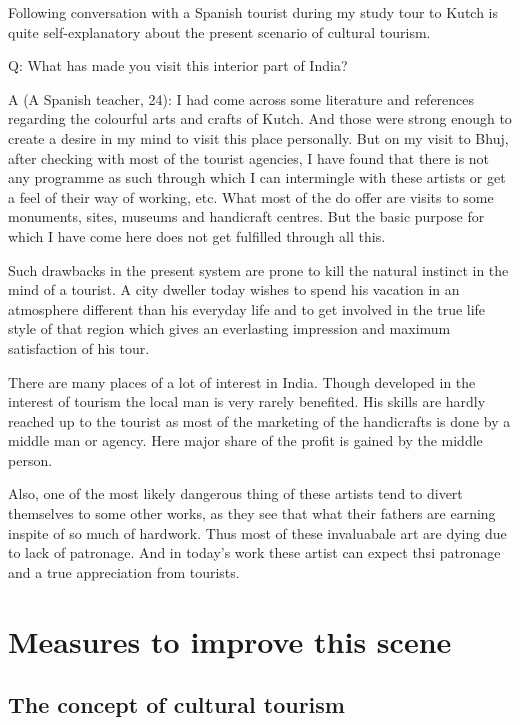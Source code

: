 Following conversation with a Spanish tourist during my study tour to Kutch is quite self-explanatory about the present scenario of cultural tourism.

Q: What has made you visit this interior part of India?

A (A Spanish teacher, 24): I had come across some literature and references regarding the colourful arts and crafts of Kutch. And those were strong enough to create a desire in my mind to visit this place personally. But on my visit to Bhuj, after checking with most of the tourist agencies, I have found that there is not any programme as such through which I can intermingle with these artists or get a feel of their way of working, etc. What most of the do offer are visits to some monuments, sites, museums and handicraft centres. But the basic purpose for which I have come here does not get fulfilled through all this.

Such drawbacks in the present system are prone to kill the natural instinct in the mind of a tourist. A city dweller today wishes to spend his vacation in an atmosphere different than his everyday life and to get involved in the true life style of that region which gives an everlasting impression and maximum satisfaction of his tour.

There are many places of a lot of interest in India. Though developed in the interest of tourism the local man is very rarely benefited. His skills are hardly reached up to the tourist as most of the marketing of the handicrafts is done by a middle man or agency. Here major share of the profit is gained by the middle person.

Also, one of the most likely dangerous thing of these artists tend to divert themselves to some other works, as they see that what their fathers are earning inspite of so much of hardwork. Thus most of these invaluabale art are dying due to lack of patronage. And in today's work these artist can expect thsi patronage and a true appreciation from tourists.


\section{Measures to improve this scene} %
\label{sec:measures}

\subsection{The concept of cultural tourism} %
\label{sub:concept_ct}

